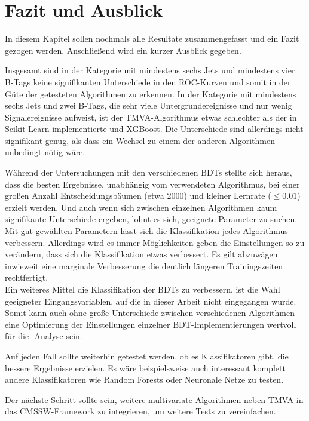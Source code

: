 
\chapter{Fazit und Ausblick}
\label{ch:Fazit}

{}

In diesem Kapitel sollen nochmals alle Resultate zusammengefasst und ein Fazit gezogen werden. Anschlie\ss end wird ein kurzer Ausblick gegeben.

Insgesamt sind in der Kategorie mit mindestens sechs Jets und mindestens vier B-Tags keine signifikanten Unterschiede in den ROC-Kurven und somit in der G\"ute der getesteten Algorithmen zu erkennen. In der Kategorie mit mindestens sechs Jets und zwei B-Tags, die sehr viele Untergrundereignisse und nur wenig Signalereignisse aufweist, ist der TMVA-Algorithmus etwas schlechter als der in Scikit-Learn implementierte und XGBoost. Die Unterschiede sind allerdings nicht signifikant genug, als dass ein Wechsel zu einem der anderen Algorithmen unbedingt n\"otig w\"are.

W\"ahrend der Untersuchungen mit den verschiedenen BDTs stellte sich heraus, dass die besten Ergebnisse, unabh\"angig vom verwendeten Algorithmus, bei einer gro\ss en Anzahl Entscheidungsb\"aumen (etwa 2000) und kleiner Lernrate ($\leq \num{0,01}$) erzielt werden. Und auch wenn sich zwischen einzelnen Algorithmen kaum signifikante Unterschiede ergeben, lohnt es sich, geeignete Parameter zu suchen. Mit gut gew\"ahlten Parametern l\"asst sich die Klassifikation jedes Algorithmus verbessern. Allerdings wird es immer M\"oglichkeiten geben die Einstellungen so zu ver\"andern, dass sich die Klassifikation etwas verbessert. Es gilt abzuw\"agen inwieweit eine marginale Verbesserung die deutlich l\"angeren Trainingszeiten rechtfertigt.\\
Ein weiteres Mittel die Klassifikation der BDTs zu verbessern, ist die Wahl geeigneter Eingangsvariablen, auf die in dieser Arbeit nicht eingegangen wurde. Somit kann auch ohne gro\ss e Unterschiede zwischen verschiedenen Algorithmen eine Optimierung der Einstellungen einzelner BDT-Implementierungen wertvoll f\"ur die \ttH-Analyse sein.

Auf jeden Fall sollte weiterhin getestet werden, ob es Klassifikatoren gibt, die bessere Ergebnisse erzielen. Es w\"are beispielsweise auch interessant komplett andere Klassifikatoren wie Random Forests oder Neuronale Netze zu testen.

Der n\"achste Schritt sollte sein, weitere multivariate Algorithmen neben TMVA in das CMSSW-Framework zu integrieren, um weitere Tests zu vereinfachen.